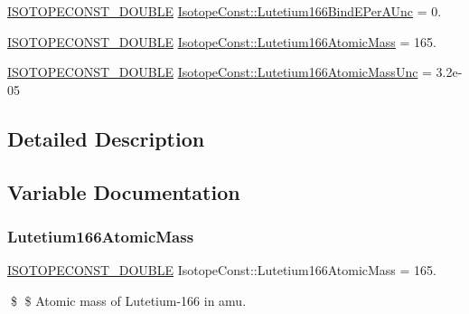 \begin{DoxyCompactItemize}
\mbox{\hyperlink{group___isotope_const-_macros_ga8f45a7272ce02c0b4c65c44636ed719a}{I\+S\+O\+T\+O\+P\+E\+C\+O\+N\+S\+T\+\_\+\+D\+O\+U\+B\+LE}} \mbox{\hyperlink{group___isotope_const-_lutetium-_lu166_gacdf16aac319f89c890b09e0d490399d5}{Isotope\+Const\+::\+Lutetium166\+Bind\+E\+Per\+A\+Unc}} = 0.
\item 
\mbox{\hyperlink{group___isotope_const-_macros_ga8f45a7272ce02c0b4c65c44636ed719a}{I\+S\+O\+T\+O\+P\+E\+C\+O\+N\+S\+T\+\_\+\+D\+O\+U\+B\+LE}} \mbox{\hyperlink{group___isotope_const-_lutetium-_lu166_ga59ea52583b2d4ddefca7352865d0f49e}{Isotope\+Const\+::\+Lutetium166\+Atomic\+Mass}} = 165.
\item 
\mbox{\hyperlink{group___isotope_const-_macros_ga8f45a7272ce02c0b4c65c44636ed719a}{I\+S\+O\+T\+O\+P\+E\+C\+O\+N\+S\+T\+\_\+\+D\+O\+U\+B\+LE}} \mbox{\hyperlink{group___isotope_const-_lutetium-_lu166_gab66c4a24743a86e07e4d76285dbebfb5}{Isotope\+Const\+::\+Lutetium166\+Atomic\+Mass\+Unc}} = 3.\+2e-\/05
\end{DoxyCompactItemize}


\subsection{Detailed Description}


\subsection{Variable Documentation}
\mbox{\label{group___isotope_const-_lutetium-_lu166_ga59ea52583b2d4ddefca7352865d0f49e}} 
\subsubsection{\texorpdfstring{Lutetium166\+Atomic\+Mass}{Lutetium166AtomicMass}}
{\footnotesize\ttfamily \mbox{\hyperlink{group___isotope_const-_macros_ga8f45a7272ce02c0b4c65c44636ed719a}{I\+S\+O\+T\+O\+P\+E\+C\+O\+N\+S\+T\+\_\+\+D\+O\+U\+B\+LE}} Isotope\+Const\+::\+Lutetium166\+Atomic\+Mass = 165.}

\$ \$ Atomic mass of Lutetium-\/166 in amu. \mbox{\label{group___isotope_const-_lutetium-_lu166_gab66c4a24743a86e07e4d76285dbebfb5}} 
